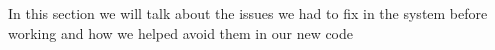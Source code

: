 In this section we will talk about the issues we had to fix in the system before
working and how we helped avoid them in our new code


